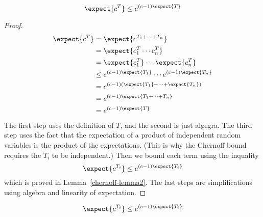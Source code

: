 \begin{lemma}
\label{chernoff-lemma1}
\[
\expect{c^T} \leq e^{(c-1) \expect{T}}
\]
\end{lemma}

\begin{proof}
\begin{align*}
    \expect{c^T} & = \expect{c^{T_1 + \cdots + T_n}} \\
            & = \expect{c^T_1  \cdots c^T_n} \\
            & = \expect{c^T_1}  \cdots \expect{c^T_n} \\
            & \leq e^{(c-1) \expect{T_1}} \cdots  e^{(c-1) \expect{T_n}} \\
            & =e^{(c-1) (\expect{T_1} + \cdots + \expect{T_n})} \\
            & =e^{(c-1) \expect{T_1 + \cdots + T_n}} \\
            & =e^{(c-1) \expect{T}}
\end{align*}
The first step uses the definition of $T$, and the second is just
algegra.  The third step uses the fact that the expectation of a
product of independent random variables is the product of the
expectations.  (This is why the Chernoff bound requires the $T_i$ to
be independent.) Then we bound each term using the inquality
\[
    \expect{c^{T_i}} \leq e^{(c - 1) \expect{T_i}}
\]
which is proved in Lemma~\ref{chernoff-lemma2}.  The last steps are
simplifications using algebra and linearity of expectation.
\end{proof}

\begin{lemma}
\label{chernoff-lemma2}
\[
\expect{c^{T_i}} \leq e^{(c - 1) \expect{T_i}}
\]
\end{lemma}

